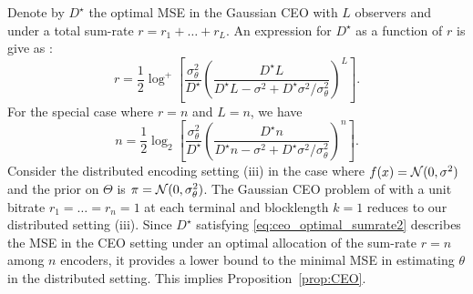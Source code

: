 %
Denote by $D^\star$ the optimal MSE in the Gaussian CEO with $L$ observers and under a total sum-rate $r = r_1 + \ldots +r_L$. An expression for $D^\star$ as a function of $r$ is give as \cite[Eq. 10]{chen2004upper}:
\begin{equation} \label{eq:ceo_optimal_sumrate}
r = \frac{1}{2} \log^+ \left[ \frac{\sigma_\theta^2}{D^\star} \left( \frac{D^\star L}{ D^\star L - \sigma^2 + D^\star \sigma^2 / \sigma_\theta^2 }\right)^L  \right].
\end{equation}
For the special case where $r = n$ and $L=n$, we have
\begin{equation} \label{eq:ceo_optimal_sumrate2}
n = \frac{1}{2} \log_2 \left[ \frac{\sigma_\theta^2}{D^\star} \left(\frac{ D^\star n }{D^\star n - \sigma^2 + D^\star \sigma^2/\sigma_\theta^2 }  \right)^n  \right].
\end{equation}
Consider the distributed encoding setting (iii) in the case where $f(x) = \mathcal{N}(0,\sigma^2)$ and the prior on $\Theta$ is $\pi = \mathcal{N}(0,\sigma_\theta^2)$. The Gaussian CEO problem of \cite{viswanathan1997quadratic} with a unit bitrate $r_1=\ldots = r_n =1$ at each terminal and blocklength $k=1$ reduces to our distributed setting (iii). Since $D^\star$ satisfying \eqref{eq:ceo_optimal_sumrate2} describes the MSE in the CEO setting under an optimal allocation of the sum-rate $r = n$ among $n$ encoders, it provides a lower bound to the minimal MSE in estimating $\theta$ in the distributed setting. 
This implies Proposition~\ref{prop:CEO}. 
